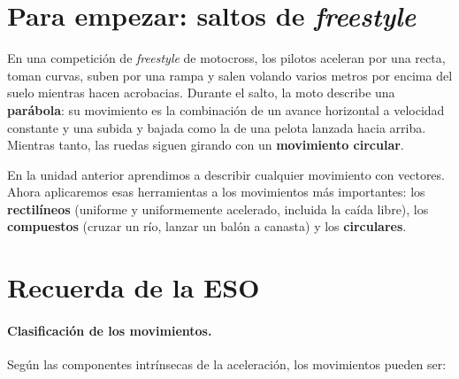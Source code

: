 
\section*{Para empezar: saltos de \textit{freestyle}}

En una competición de \textit{freestyle} de motocross, los pilotos aceleran por una recta, toman curvas, suben por una rampa y salen
volando varios metros por encima del suelo mientras hacen acrobacias. Durante el salto, la moto describe una \textbf{parábola}: su
movimiento es la combinación de un avance horizontal a velocidad constante y una subida y bajada como la de una pelota lanzada hacia
arriba. Mientras tanto, las ruedas siguen girando con un \textbf{movimiento circular}.

En la unidad anterior aprendimos a describir cualquier movimiento con vectores. Ahora aplicaremos esas herramientas a los movimientos
más importantes: los \textbf{rectilíneos} (uniforme y uniformemente acelerado, incluida la caída libre), los \textbf{compuestos}
(cruzar un río, lanzar un balón a canasta) y los \textbf{circulares}.

\section{Recuerda de la ESO}\label{sec:ud9-eso}

\paragraph{Clasificación de los movimientos.} Según las componentes intrínsecas de la aceleración, los movimientos pueden ser:


